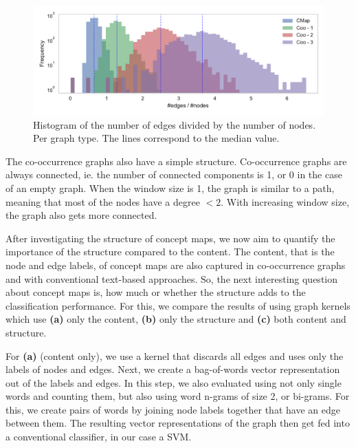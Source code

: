 \begin{figure}[htb!]
\centering
\includegraphics[width=0.7\linewidth]{assets/figures/hist-edgesnodes.pdf}
\caption[Statistics: Histogram of the number of edges divided by the number of nodes]{Histogram of the number of edges divided by the number of nodes. Per graph type. The lines correspond to the median value.}
\label{fig:histogram-edges-div-nodes-per-type}
\end{figure}

The co-occurrence graphs also have a simple structure.
Co-occurrence graphs are always connected, ie. the number of connected components is 1, or 0 in the case of an empty graph.
When the window size is 1, the graph is similar to a path, meaning that most of the nodes have a degree $< 2$. With increasing window size, the graph also gets more connected.


After investigating the structure of concept maps, we now aim to quantify the importance of the structure compared to the content.
The content, that is the node and edge labels, of concept maps are also captured in co-occurrence graphs and with conventional text-based approaches. So, the next interesting question about concept maps is, how much or whether the structure adds to the classification performance.
For this, we compare the results of using graph kernels which use \textbf{(a)} only the content, \textbf{(b)} only the structure and \textbf{(c)} both content and structure.

For \textbf{(a)} (content only), we use a kernel that discards all edges and uses only the labels of nodes and edges. Next, we create a bag-of-words vector representation out of the labels and edges.
In this step, we also evaluated using not only single words and counting them, but also using word n-grams of size 2, or bi-grams.
For this, we create pairs of words by joining node labels together that have an edge between them.
The resulting vector representations of the graph then get fed into a conventional classifier, in our case a SVM.

